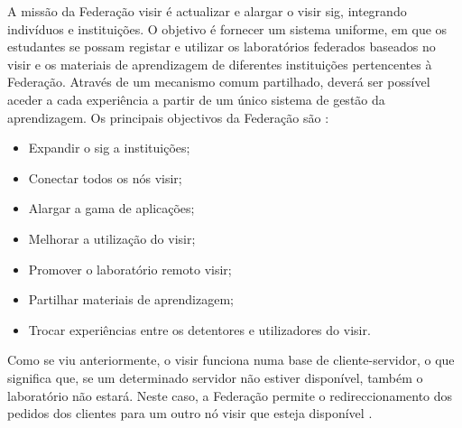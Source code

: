 A missão da Federação \acrshort{visir} é actualizar e alargar o \acrshort{visir} \acrshort{sig}, integrando indivíduos e instituições. O objetivo é fornecer um sistema uniforme, em que os estudantes se possam registar e utilizar os laboratórios federados baseados no \acrshort{visir} e os materiais de aprendizagem de diferentes instituições pertencentes à Federação. Através de um mecanismo comum partilhado, deverá ser possível aceder a cada experiência a partir de um único sistema de gestão da aprendizagem. Os principais objectivos da Federação são \cite{visirfederation}:
\begin{itemize}
    \item Expandir o \acrshort{sig} a instituições;
    \item Conectar todos os nós \acrshort{visir};
    \item Alargar a gama de aplicações;
    \item Melhorar a utilização do \acrshort{visir};
    \item Promover o laboratório remoto \acrshort{visir};
    \item Partilhar materiais de aprendizagem;
    \item Trocar experiências entre os detentores e utilizadores do \acrshort{visir}.
\end{itemize}

Como se viu anteriormente, o \acrshort{visir} funciona numa base de cliente-servidor, o que significa que, se um determinado servidor não estiver disponível, também o laboratório não estará. Neste caso, a Federação permite o redireccionamento dos pedidos dos clientes para um outro nó \acrshort{visir} que esteja disponível \cite{kreiter}.
